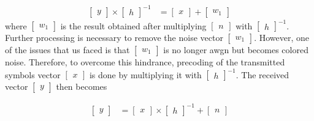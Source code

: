 \begin{align}
\begin{bmatrix}
y
\end{bmatrix}
\times
\begin{bmatrix}
h
\end{bmatrix}
^{-1}
&=
\begin{bmatrix}
x
\end{bmatrix}
+
\begin{bmatrix}
w_1
\end{bmatrix}
\end{align}
where $\begin{bmatrix} w_1 \end{bmatrix}$ is the result obtained after multiplying $\begin{bmatrix} n \end{bmatrix}$ with $\begin{bmatrix}h \end{bmatrix}^{-1}$.\\

Further processing is necessary to remove the noise vector $\begin{bmatrix} w_1 \end{bmatrix}$. However, one of the issues that us faced is that $\begin{bmatrix} w_1 \end{bmatrix}$ is no longer \acrshort{awgn} but becomes colored noise. Therefore, to overcome this hindrance,  precoding of the transmitted symbols vector $\begin{bmatrix} x \end{bmatrix}$ is done by multiplying it with $\begin{bmatrix} h \end{bmatrix}^{-1}$. The received vector $\begin{bmatrix} y \end{bmatrix}$ then becomes

\begin{align}
\begin{bmatrix} y \end{bmatrix} &=
\begin{bmatrix} x \end{bmatrix}
\times
\begin{bmatrix} h \end{bmatrix}^{-1}
+
\begin{bmatrix} n \end{bmatrix}
\end{align}

